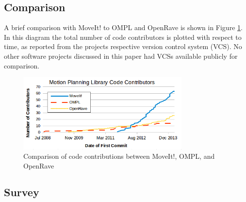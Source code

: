 \documentclass[10pt,journal,compsoc]{joser1}
\begin{document}
{%
\subsection{Comparison}
\label{sec::comparison}

A brief comparison with MoveIt! to OMPL and OpenRave is shown in Figure \ref{fig:comparison}. In this diagram the total number of code contributors is plotted with respect to time, as reported from the projects respective version control system (VCS). No other software projects discussed in this paper had VCSs available publicly for comparison.

\begin{figure}[!t]
\centering
\includegraphics[width=3.4in]{coleman_20131110_f17}
\caption{Comparison of code contributions between MoveIt!, OMPL, and OpenRave}
\label{fig:comparison}
\end{figure}

\subsection{Survey}
\label{sec::survey}

}
\end{document}

